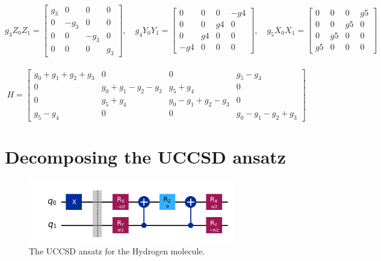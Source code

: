 \documentclass{article}
\begin{document}
\\
\[
	g_3 Z_0 Z_1 = \begin{bmatrix}
		g_3 & 0    & 0    & 0   \\
		0   & -g_3 & 0    & 0   \\
		0   & 0    & -g_3 & 0   \\
		0   & 0    & 0    & g_3
	\end{bmatrix}, \quad
	g_4 Y_0 Y_1 = \begin{bmatrix}
		0   & 0  & 0  & -g4 \\
		0   & 0  & g4 & 0   \\
		0   & g4 & 0  & 0   \\
		-g4 & 0  & 0  & 0
	\end{bmatrix}, \quad
	g_5 X_0 X_1 = \begin{bmatrix}
		0  & 0  & 0  & g5 \\
		0  & 0  & g5 & 0  \\
		0  & g5 & 0  & 0  \\
		g5 & 0  & 0  & 0
	\end{bmatrix}
\]
\\
\[
	H = \begin{bmatrix}
		g_0 + g_1 + g_2 + g_3 & 0                     & 0                     & g_5 - g_4              \\
		0                     & g_0 + g_1 - g_2 - g_3 & g_5 + g_4             & 0                      \\
		0                     & g_5 + g_4             & g_0 - g_1 + g_2 - g_3 & 0                      \\
		g_5 - g_4             & 0                     & 0                     & g_0 - g_1 - g_2 +  g_3
	\end{bmatrix}
\]
\section{Decomposing the UCCSD ansatz}
\begin{figure}[h]
	\label{fig:Figure 1}
	\centering
	\includegraphics[width=0.8\textwidth, height=0.2\textheight]{Circ.png}
	\caption{The UCCSD ansatz for the Hydrogen molecule.}
\end{figure}
\end{document}
